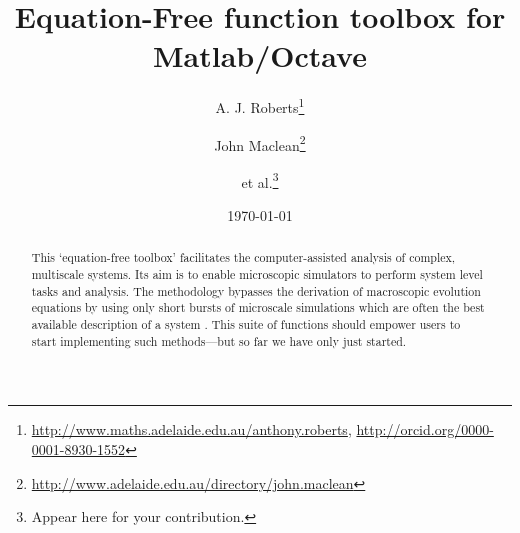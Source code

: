 \documentclass[11pt,a5paper,twoside]{article}
\title{Equation-Free function toolbox for Matlab/Octave}
\author{A. J. Roberts\thanks{%
\url{http://www.maths.adelaide.edu.au/anthony.roberts},
\url{http://orcid.org/0000-0001-8930-1552}}
\and John Maclean\thanks{%
\url{http://www.adelaide.edu.au/directory/john.maclean}}
\and et al.\thanks{Appear here for your contribution.}
}
\date{\today}
\makeatletter
\def\fancyvrbStartStop{%
  \edef\FancyVerbStartString{\@percentchar\@charrb} 
  \edef\FancyVerbStopString{\@percentchar\@charlb} }
\makeatother
\begin{document}

\maketitle

\begin{abstract}
This `equation-free toolbox' facilitates the computer-assisted analysis of complex, multiscale systems.
Its aim is to enable microscopic simulators to perform system level tasks and analysis.
The methodology bypasses the derivation of macroscopic evolution equations by using only short bursts of microscale simulations which are often the best available description of a system
\cite[e.g.]{Kevrekidis09a, Kevrekidis04a, Kevrekidis03b}.
This suite of functions should empower users to start implementing such methods---but so far we have only just started.
\end{abstract}

\tableofcontents



\fancyvrbStartStop 


%

%


%

%

\appendix
\let\FancyVerbStartString\relax 
\let\FancyVerbStopString\relax




\end{document}

